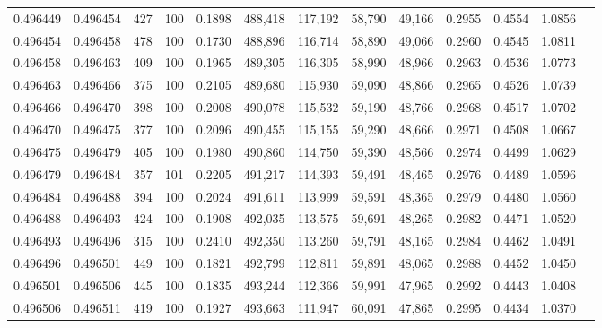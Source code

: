 \begin{tabular}{rrrrrrrrrrrrr}
0.496449 & 0.496454 &   427 & 100 &                                     0.1898 & 488,418 & 117,192 &  58,790 &  49,166 & 0.2955 & 0.4554 & 1.0856 \\
0.496454 & 0.496458 &   478 & 100 &                                     0.1730 & 488,896 & 116,714 &  58,890 &  49,066 & 0.2960 & 0.4545 & 1.0811 \\
0.496458 & 0.496463 &   409 & 100 &                                     0.1965 & 489,305 & 116,305 &  58,990 &  48,966 & 0.2963 & 0.4536 & 1.0773 \\
0.496463 & 0.496466 &   375 & 100 &                                     0.2105 & 489,680 & 115,930 &  59,090 &  48,866 & 0.2965 & 0.4526 & 1.0739 \\
0.496466 & 0.496470 &   398 & 100 &                                     0.2008 & 490,078 & 115,532 &  59,190 &  48,766 & 0.2968 & 0.4517 & 1.0702 \\
0.496470 & 0.496475 &   377 & 100 &                                     0.2096 & 490,455 & 115,155 &  59,290 &  48,666 & 0.2971 & 0.4508 & 1.0667 \\
0.496475 & 0.496479 &   405 & 100 &                                     0.1980 & 490,860 & 114,750 &  59,390 &  48,566 & 0.2974 & 0.4499 & 1.0629 \\
0.496479 & 0.496484 &   357 & 101 &                                     0.2205 & 491,217 & 114,393 &  59,491 &  48,465 & 0.2976 & 0.4489 & 1.0596 \\
0.496484 & 0.496488 &   394 & 100 &                                     0.2024 & 491,611 & 113,999 &  59,591 &  48,365 & 0.2979 & 0.4480 & 1.0560 \\
0.496488 & 0.496493 &   424 & 100 &                                     0.1908 & 492,035 & 113,575 &  59,691 &  48,265 & 0.2982 & 0.4471 & 1.0520 \\
0.496493 & 0.496496 &   315 & 100 &                                     0.2410 & 492,350 & 113,260 &  59,791 &  48,165 & 0.2984 & 0.4462 & 1.0491 \\
0.496496 & 0.496501 &   449 & 100 &                                     0.1821 & 492,799 & 112,811 &  59,891 &  48,065 & 0.2988 & 0.4452 & 1.0450 \\
0.496501 & 0.496506 &   445 & 100 &                                     0.1835 & 493,244 & 112,366 &  59,991 &  47,965 & 0.2992 & 0.4443 & 1.0408 \\
0.496506 & 0.496511 &   419 & 100 &                                     0.1927 & 493,663 & 111,947 &  60,091 &  47,865 & 0.2995 & 0.4434 & 1.0370 \\

\end{tabular}
